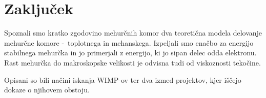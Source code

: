 \section{Zaključek}

Spoznali smo kratko zgodovino mehurčnih komor dva teoretična modela delovanje mehurčne komore -\ toplotnega in mehanskega. Izpeljali smo enačbo za energijo stabilnega mehurčka in jo primerjali z energijo, ki jo sipan delec odda elektronu. Rast mehurčka do makroskopske velikosti je odvisna tudi od viskoznosti tekočine.

Opisani so bili načini iskanja WIMP-ov ter dva izmed projektov, kjer iščejo dokaze o njihovem obstoju.
